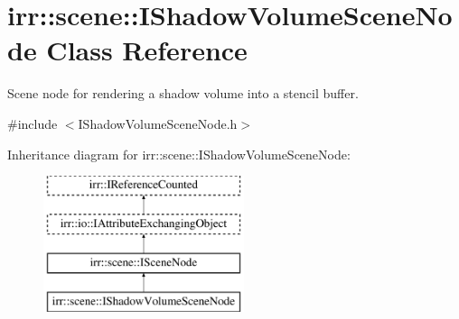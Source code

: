 \hypertarget{classirr_1_1scene_1_1IShadowVolumeSceneNode}{}\section{irr\+:\+:scene\+:\+:I\+Shadow\+Volume\+Scene\+Node Class Reference}
\label{classirr_1_1scene_1_1IShadowVolumeSceneNode}


Scene node for rendering a shadow volume into a stencil buffer.  




{\ttfamily \#include $<$I\+Shadow\+Volume\+Scene\+Node.\+h$>$}

Inheritance diagram for irr\+:\+:scene\+:\+:I\+Shadow\+Volume\+Scene\+Node\+:\begin{figure}[H]
\begin{center}
\leavevmode
\includegraphics[height=4.000000cm]{classirr_1_1scene_1_1IShadowVolumeSceneNode}
\end{center}
\end{figure}
